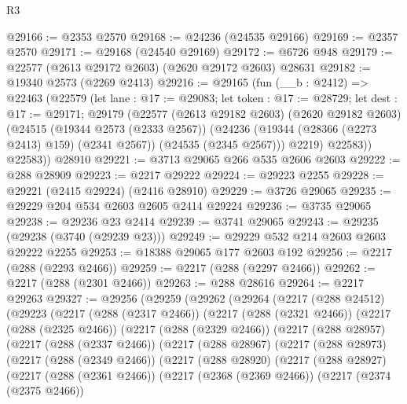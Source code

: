 \begin{lexlean}{R3}
\begin{coremodule}
@29166 := @2353 @2570
@29168 := @24236 (@24535 @29166)
@29169 := @2357 @2570
@29171 := @29168 (@24540 @29169)
@29172 := @6726 @948
@29179 := @22577 (@2613 @29172 @2603) (@2620 @29172 @2603) @28631
@29182 := @19340 @2573 (@2269 @2413)
@29216 := @29165
    (fun (__b : @2412) =>
    @22463
      (@22579
        (let lane : @17 := @29083;
        let token : @17 := @28729;
        let dest : @17 := @29171;
        @29179
          (@22577
            (@2613 @29182 @2603)
            (@2620 @29182 @2603)
            (@24515
              (@19344 @2573 (@2333 @2567))
              (@24236 (@19344 (@28366 (@2273 @2413) @159) (@2341 @2567)) (@24535 (@2345 @2567)))
              @2219)
            @22583))
        @22583))
    @28910
@29221 := @3713 @29065 @266 @535 @2606 @2603
@29222 := @288 @28909
@29223 := @2217 @29222
@29224 := @29223 @2255
@29228 := @29221 (@2415 @29224) (@2416 @28910)
@29229 := @3726 @29065
@29235 := @29229 @204 @534 @2603 @2605 @2414 @29224
@29236 := @3735 @29065
@29238 := @29236 @23 @2414
@29239 := @3741 @29065
@29243 := @29235 (@29238 (@3740 (@29239 @23)))
@29249 := @29229 @532 @214 @2603 @2603 @29222 @2255
@29253 := @18388 @29065 @177 @2603 @192
@29256 := @2217 (@288 (@2293 @2466))
@29259 := @2217 (@288 (@2297 @2466))
@29262 := @2217 (@288 (@2301 @2466))
@29263 := @288 @28616
@29264 := @2217 @29263
@29327 := @29256
    (@29259
      (@29262
        (@29264
          (@2217
            (@288 @24512)
            (@29223
              (@2217
                (@288 (@2317 @2466))
                (@2217
                  (@288 (@2321 @2466))
                  (@2217
                    (@288 (@2325 @2466))
                    (@2217
                      (@288 (@2329 @2466))
                      (@2217
                        (@288 @28957)
                        (@2217
                          (@288 (@2337 @2466))
                          (@2217
                            (@288 @28967)
                            (@2217
                              (@288 @28973)
                              (@2217
                                (@288 (@2349 @2466))
                                (@2217
                                  (@288 @28920)
                                  (@2217
                                    (@288 @28927)
                                    (@2217
                                      (@288 (@2361 @2466))
                                      (@2217
                                        (@2368 (@2369 @2466))
                                        (@2217
                                          (@2374 (@2375 @2466))

\end{coremodule}
\end{lexlean}
